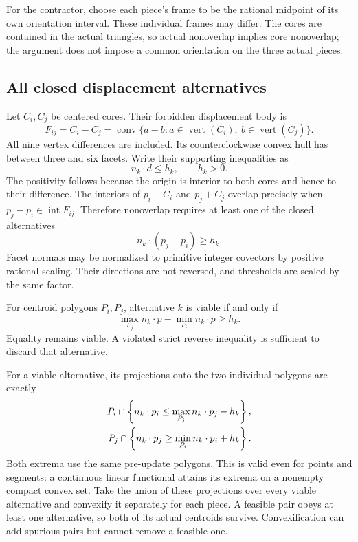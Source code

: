 \documentclass[11pt]{article}
\begin{document}
For the contractor, choose each piece's frame to be the rational midpoint of its own orientation interval. These individual frames may differ. The cores are contained in the actual triangles, so actual nonoverlap implies core nonoverlap; the argument does not impose a common orientation on the three actual pieces.

\subsection{All closed displacement alternatives}

Let $C_i,C_j$ be centered cores. Their forbidden displacement body is
\[
 F_{ij}=C_i-C_j
       =\operatorname{conv}\{a-b:a\in\operatorname{vert}(C_i),\ b\in\operatorname{vert}(C_j)\}.
\]
All nine vertex differences are included. Its counterclockwise convex hull has between three and six facets. Write their supporting inequalities as
\[
 n_k\cdot d\le h_k,\qquad h_k>0.
\]
The positivity follows because the origin is interior to both cores and hence to their difference. The interiors of $p_i+C_i$ and $p_j+C_j$ overlap precisely when $p_j-p_i\in\operatorname{int}F_{ij}$. Therefore nonoverlap requires at least one of the closed alternatives
\begin{equation}\label{eq:facet-disjunction}
 n_k\cdot(p_j-p_i)\ge h_k.
\end{equation}
Facet normals may be normalized to primitive integer covectors by positive rational scaling. Their directions are not reversed, and thresholds are scaled by the same factor.

For centroid polygons $P_i,P_j$, alternative $k$ is viable if and only if
\begin{equation}\label{eq:viable}
 \max_{P_j}n_k\cdot p-\min_{P_i}n_k\cdot p\ge h_k.
\end{equation}
Equality remains viable. A violated strict reverse inequality is sufficient to discard that alternative.

For a viable alternative, its projections onto the two individual polygons are exactly
\begin{align}\label{eq:project}
 P_i\cap\left\{n_k\cdot p_i\le\max_{P_j}n_k\cdot p_j-h_k\right\},\\
 P_j\cap\left\{n_k\cdot p_j\ge\min_{P_i}n_k\cdot p_i+h_k\right\}.\notag
\end{align}
Both extrema use the same pre-update polygons. This is valid even for points and segments: a continuous linear functional attains its extrema on a nonempty compact convex set. Take the union of these projections over every viable alternative and convexify it separately for each piece. A feasible pair obeys at least one alternative, so both of its actual centroids survive. Convexification can add spurious pairs but cannot remove a feasible one.
\end{document}
